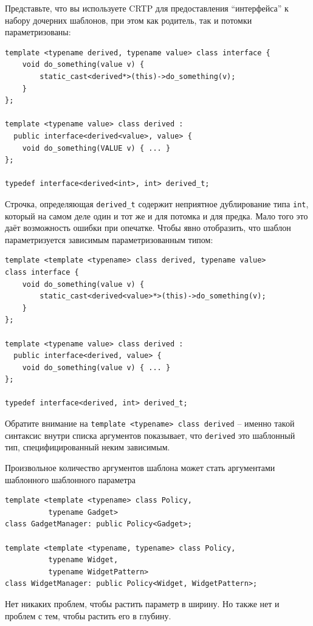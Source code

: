 \documentclass[a4paper,12pt,oneside]{article}
\begin{document}
Представьте, что вы используете CRTP для предоставления ``интерфейса'' к набору дочерних шаблонов, при этом как родитель, так и потомки параметризованы:

\begin{lstlisting}
template <typename derived, typename value> class interface {
    void do_something(value v) {
        static_cast<derived*>(this)->do_something(v);
    }
};

template <typename value> class derived : 
  public interface<derived<value>, value> {
    void do_something(VALUE v) { ... }
};

typedef interface<derived<int>, int> derived_t;
\end{lstlisting}

Строчка, определяющая \lstinline!derived_t! содержит неприятное дублирование типа  \lstinline!int!, который на самом деле один и тот же и для потомка и для предка. Мало того это даёт возможность ошибки при опечатке. Чтобы явно отобразить, что шаблон параметризуется зависимым параметризованным типом:

\begin{lstlisting}
template <template <typename> class derived, typename value> 
class interface {
    void do_something(value v) {
        static_cast<derived<value>*>(this)->do_something(v);
    }
};

template <typename value> class derived : 
  public interface<derived, value> {
    void do_something(value v) { ... }
};

typedef interface<derived, int> derived_t;
\end{lstlisting}

Обратите внимание на \lstinline!template <typename> class derived! -- именно такой синтаксис внутри списка аргументов показывает, что \lstinline!derived! это шаблонный тип, специфицированный неким зависимым.

Произвольное количество аргументов шаблона может стать аргументами шаблонного шаблонного параметра

\begin{lstlisting}
template <template <typename> class Policy,
          typename Gadget>
class GadgetManager: public Policy<Gadget>;

template <template <typename, typename> class Policy,
          typename Widget, 
          typename WidgetPattern>
class WidgetManager: public Policy<Widget, WidgetPattern>;
\end{lstlisting}

Нет никаких проблем, чтобы растить параметр в ширину. Но также нет и проблем с тем, чтобы растить его в глубину.
\end{document}
